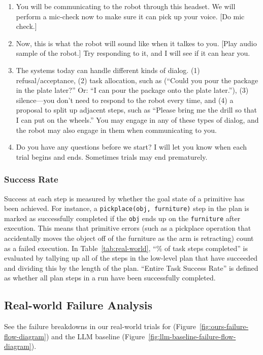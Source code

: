 \begin{enumerate}
    \item You will be communicating to the robot through this headset. We will perform a mic-check now to make sure it can pick up your voice. [Do mic check.]
    \item Now, this is what the robot will sound like when it talkes to you. [Play audio sample of the robot.] Try responding to it, and I will see if it can hear you.
    \item The systems today can handle different kinds of dialog. (1) refusal/acceptance, (2) task allocation, such as (``Could you pour the package in the plate later?'' Or: ``I can pour the package onto the plate later.''), (3) silence---you don't need to respond to the robot every time, and (4) a proposal to split up adjacent steps, such as ``Please bring me the drill so that I can put on the wheels.'' You may engage in any of these types of dialog, and the robot may also engage in them when communicating to you.
    \item Do you have any questions before we start? I will let you know when each trial begins and ends. Sometimes trials may end prematurely.
\end{enumerate}

\subsubsection{Success Rate}
Success at each step is measured by whether the goal state of a primitive has been achieved. For instance, a \texttt{pickplace(obj, furniture)} step in the plan is marked as successfully completed if the \texttt{obj} ends up on the \texttt{furniture} after execution. This means that primitive errors (such as a pickplace operation that accidentally moves the object off of the furniture as the arm is retracting) count as a failed execution. In Table~\ref{tab:real-world}, ``\% of task steps completed'' is evaluated by tallying up all of the steps in the low-level plan that have succeeded and dividing this by the length of the plan. ``Entire Task Success Rate'' is defined as whether all plan steps in a run have been successfully completed.

\subsection{Real-world Failure Analysis}
See the failure breakdowns in our real-world trials for \ours{} (Figure~\ref{fig:ours-failure-flow-diagram}) and the LLM baseline (Figure~\ref{fig:llm-baseline-failure-flow-diagram}).

